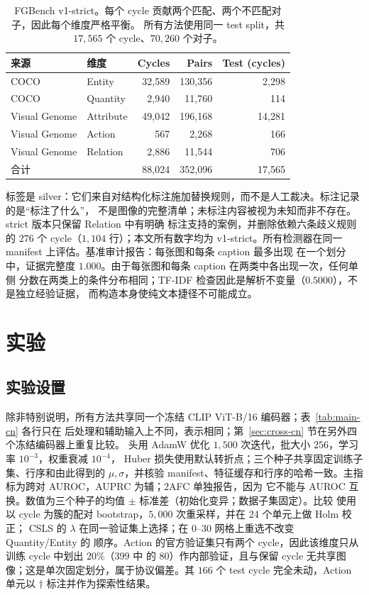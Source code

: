 \documentclass[10pt,twocolumn,a4paper]{ctexart}
\begin{document}
\begin{table}[t]
\centering
\small
\setlength{\tabcolsep}{2pt}
\caption{FGBench v1-strict。每个 cycle 贡献两个匹配、两个不匹配对子，因此每个维度严格平衡。
所有方法使用同一 test split，共 $17{,}565$ 个 cycle、$70{,}260$ 个对子。}
\label{tab:fgbench-cn}
\begin{tabular}{llrrr}
\toprule
来源 & 维度 & Cycles & Pairs & Test (cycles) \\
\midrule
COCO          & Entity     & 32{,}589 & 130{,}356 &  2{,}298 \\
COCO          & Quantity   &  2{,}940 &  11{,}760 &    114 \\
Visual Genome & Attribute  & 49{,}042 & 196{,}168 & 14{,}281 \\
Visual Genome & Action     &    567   &   2{,}268 &    166 \\
Visual Genome & Relation   &  2{,}886 &  11{,}544 &    706 \\
\midrule
\multicolumn{2}{l}{合计}      & 88{,}024 & 352{,}096 & 17{,}565 \\
\bottomrule
\end{tabular}
\end{table}

标签是 silver：它们来自对结构化标注施加替换规则，而不是人工裁决。标注记录的是“标注了什么”，
不是图像的完整清单；未标注内容被视为未知而非不存在。strict 版本只保留 Relation 中有明确
标注支持的案例，并删除依赖六条歧义规则的 $276$ 个 cycle（$1{,}104$ 行）；本文所有数字均为
v1-strict。所有检测器在同一 manifest 上评估。基准审计报告：每张图和每条 caption 最多出现
在一个划分中，证据完整度 $1.000$。由于每张图和每条 caption 在两类中各出现一次，任何单侧
分数在两类上的条件分布相同；TF-IDF 检查因此是解析不变量（$0.5000$），不是独立经验证据，
而构造本身使纯文本捷径不可能成立。

\section{实验}
\label{sec:exp-cn}

\subsection{实验设置}
除非特别说明，所有方法共享同一个冻结 CLIP ViT-B/16 编码器；表~\ref{tab:main-cn} 各行只在
后处理和辅助输入上不同，表示相同；第~\ref{sec:cross-cn} 节在另外四个冻结编码器上重复比较。
头用 AdamW 优化 $1{,}500$ 次迭代，批大小 $256$，学习率 $10^{-3}$，权重衰减 $10^{-4}$，
Huber 损失使用默认转折点；三个种子共享固定训练子集、行序和由此得到的 $\mu,\sigma$，并核验
manifest、特征缓存和行序的哈希一致。主指标为跨对 AUROC，AUPRC 为辅；2AFC 单独报告，因为
它不能与 AUROC 互换。数值为三个种子的均值 $\pm$ 标准差（初始化变异；数据子集固定）。比较
使用以 cycle 为簇的配对 bootstrap，$5{,}000$ 次重采样，并在 $24$ 个单元上做 Holm 校正；
CSLS 的 $\lambda$ 在同一验证集上选择；在 $0$--$30$ 网格上重选不改变 Quantity/Entity 的
顺序。Action 的官方验证集只有两个 cycle，因此该维度只从训练 cycle 中划出 $20\%$（$399$ 中
的 $80$）作内部验证，且与保留 cycle 无共享图像；这是单次固定划分，属于协议偏差。其 $166$
个 test cycle 完全未动，Action 单元以 $\dagger$ 标注并作为探索性结果。
\end{document}
